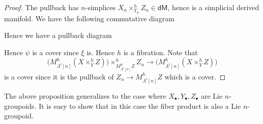 \documentclass[12pt]{amsart}
\theoremstyle{definition}
\theoremstyle{remark}
\numberwithin{equation}{section}
\newcommand{\1}{{\mathbb{1}}}
\newcommand{\dm}{\mathsf{dM}}
\begin{document}
\begin{proof}
The pullback has $n$-simplices $X_n \times^h_{Y_n} Z_n \in \dm$, hence is a simplicial derived manifold. We have the following commutative diagram
    \begin{center}
    \end{center}
Hence we have a pullback diagram
\begin{center}
\end{center}
Hence $\psi$ is a cover since $\xi$ is. Hence $h$ is a fibration. Note that 
$$
 \big(M^h_{\Lambda^i[n]} (X \times^h_{Y} Z)\big) \times^h_{M^h_{\Lambda^i[n]}Z} Z_n \to \big(M^h_{\Lambda^i[n]} {(X \times^h_{Y} Z)}\big)
$$ is a cover since it  is the pullback of $Z_n \to M^h_{\Lambda^i[n]}Z $  which is a cover.
    
\end{proof}
The above proposition generalizes to the case where $X_{\bullet}, Y_{\bullet}, Z_{\bullet}$ are Lie $n$-groupoids. It is easy to show that in this case the fiber product is also a Lie $n$-groupoid.
\end{document}
